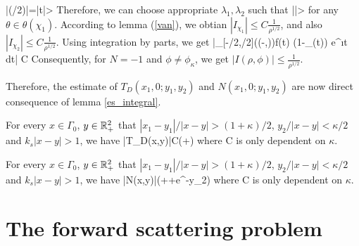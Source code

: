 \documentclass[12pt]{iopart}
\begin{document}
\be
\Bigg|(\pi/2)\Bigg|=|\sin t|>\sin \delta
\ee
Therefore, we can choose appropriate $\lambda_1,\lambda_2$ such that 
\be
||>\sin \delta
\ee
for any 
$\theta\in \theta(\chi_1)$. According to lemma (\ref{van}), we obtian $|I_{\chi_1}|\leq C\frac{1}{\rho^{1/2}}$, and also $|I_{\chi_2}|\leq C\frac{1}{\rho^{1/2}}$. Using integration by parts, we get
\ben
\Bigg|\int_{[-\pi/2,\pi/2]\bks((-\delta,\delta)\cup\chi)}f(t) (1-\chi_\delta(t)) e^{\i \rho\cos t} dt\Bigg| 
\leq C
\een
Consequently, for $N=-1$ and $\phi\neq\phi_\kappa$, we get $|I(\rho,\phi)|\leq\frac{1}{\rho^{1/2}}$.


\finproof
Therefore, the estimate of $T_D(x_1,0;y_1,y_2)$ and $N(x_1,0;y_1,y_2)$ are now direct consequence of lemma \ref{es_integral}.
\begin{lem}\label{es_dgreen}
	For every $x\in\Gamma_0$, $y\in{\mathbb{R}}_+^2$ that $|x_1-y_1|/|x-y|>(1+\kappa)/2$, $y_2/|x-y|<\kappa/2$ and $k_s |x-y|>1$, we have
	\be\hspace{-1.5cm}
	|T_D(x,y)|\leq C\Bigg(+\Bigg)
	\ee
	where C is only dependent on $\kappa$.
\end{lem}

\begin{lem}\label{es_ngreen}
	For every $x\in\Gamma_0$, $y\in{\mathbb{R}}_+^2$ that $|x_1-y_1|/|x-y|>(1+\kappa)/2$, $y_2/|x-y|<\kappa/2$ and $k_s |x-y|>1$, we have
	\be\hspace{-2.5cm}
	|N(x,y)|\leq {}\Bigg(++e^{-y_2}\Bigg)
	\ee
	where C is only dependent on $\kappa$.
\end{lem}


\section{The forward scattering problem}
\end{document}
